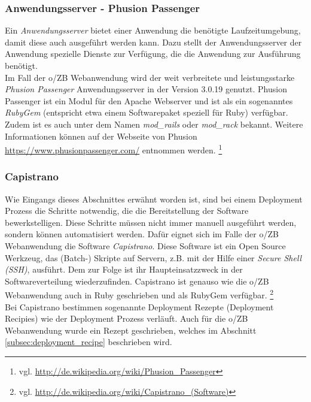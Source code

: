 \documentclass[12pt,             %
               a4paper,          %
               listof=totoc,     %
               index=totoc,      %
               bibliography=totoc,%
               oneside,         %
               BCOR1cm,          %
               english   %
               ]{scrbook}
\begin{document}
\subsubsection{Anwendungsserver - Phusion Passenger}
Ein \textit{Anwendungsserver} bietet einer Anwendung die benötigte Laufzeitumgebung, damit diese auch ausgeführt werden kann. Dazu stellt der Anwendungsserver der Anwendung spezielle Dienste zur Verfügung, die die Anwendung zur Ausführung benötigt.\\
Im Fall der o/ZB Webanwendung wird der weit verbreitete und leistungsstarke \textit{Phusion Passenger} Anwendungsserver in der Version 3.0.19 genutzt. Phusion Passenger ist ein Modul für den Apache Webserver und ist als ein sogenanntes \textit{RubyGem} (entspricht etwa einem Softwarepaket speziell für Ruby) verfügbar. Zudem ist es auch unter dem Namen \textit{mod\_rails} oder \textit{mod\_rack} bekannt. Weitere Informationen können auf der Webseite von Phusion \url{https://www.phusionpassenger.com/} entnommen werden. \footnote{vgl. \url{http://de.wikipedia.org/wiki/Phusion_Passenger}}

\subsubsection{Capistrano}
Wie Eingangs dieses Abschnittes erwähnt worden ist, sind bei einem Deployment Prozess die Schritte notwendig, die die Bereitstellung der Software bewerkstelligen. Diese Schritte müssen nicht immer manuell ausgeführt werden, sondern können automatisiert werden. Dafür eignet sich im Falle der o/ZB Webanwendung die Software \textit{Capistrano}. Diese Software ist ein Open Source Werkzeug, das (Batch-) Skripte auf Servern, z.B. mit der Hilfe einer \textit{Secure Shell (SSH)}, ausführt. Dem zur Folge ist ihr Haupteinsatzzweck in der Softwareverteilung wiederzufinden. Capistrano ist genauso wie die o/ZB Webanwendung auch in Ruby geschrieben und als RubyGem verfügbar. \footnote{vgl. \url{http://de.wikipedia.org/wiki/Capistrano_(Software)}}\\

Bei Capistrano bestimmen sogenannte Deployment Rezepte (\glqq Deployment Recipies\grqq) wie der Deployment Prozess verläuft. Auch für die o/ZB Webanwendung wurde ein Rezept geschrieben, welches im Abschnitt \vref{subsec:deployment_recipe} beschrieben wird.
\end{document}
